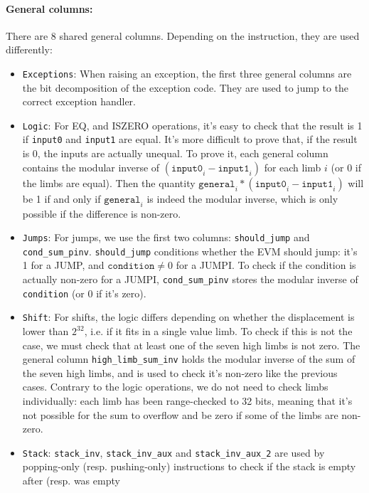 \paragraph*{General columns:} There are 8 shared general columns. Depending on the instruction, they are used differently:
\begin{itemize}
    \item  \texttt{Exceptions}: When raising an exception, the first three general columns are the bit decomposition of the exception code.
They are used to jump to the correct exception handler.
    \item  \texttt{Logic}: For EQ, and ISZERO operations, it's easy to check that the result is 1 if \texttt{input0} and \texttt{input1} are equal. It's more difficult
to prove that, if the result is 0, the inputs are actually unequal. To prove it, each general column contains the modular inverse of $(\texttt{input0}_i - \texttt{input1}_i)$
for each limb $i$ (or 0 if the limbs are equal). Then the quantity $\texttt{general}_i * (\texttt{input0}_i - \texttt{input1}_i)$ will be 1 if and only if $\texttt{general}_i$ is
indeed the modular inverse, which is only possible if the difference is non-zero.
    \item  \texttt{Jumps}: For jumps, we use the first two columns: \texttt{should\_jump} and \texttt{cond\_sum\_pinv}. \texttt{should\_jump} conditions whether the EVM should jump: it's
1 for a JUMP, and $\texttt{condition} \neq 0$ for a JUMPI. To check if the condition is actually non-zero for a JUMPI, \texttt{cond\_sum\_pinv} stores the modular inverse of
\texttt{condition} (or 0 if it's zero).
    \item  \texttt{Shift}: For shifts, the logic differs depending on whether the displacement is lower than $2^{32}$, i.e. if it fits in a single value limb.
To check if this is not the case, we must check that at least one of the seven high limbs is not zero. The general column \texttt{high\_limb\_sum\_inv} holds the modular inverse
of the sum of the seven high limbs, and is used to check it's non-zero like the previous cases.
Contrary to the logic operations, we do not need to check limbs individually: each limb has been range-checked to 32 bits, meaning that it's not possible for the sum to
overflow and be zero if some of the limbs are non-zero.
    \item  \texttt{Stack}: \texttt{stack\_inv}, \texttt{stack\_inv\_aux} and \texttt{stack\_inv\_aux\_2} are used by popping-only (resp. pushing-only) instructions to check if the stack is empty after (resp. was empty

\end{itemize}
